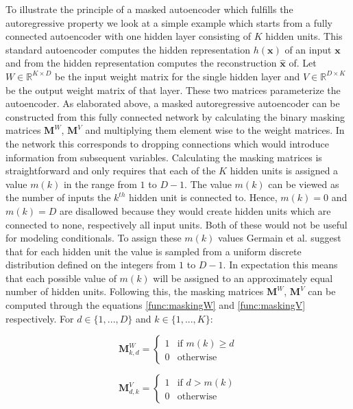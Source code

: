 \documentclass[11pt,titlepage,oneside,openany]{book}
\begin{document}
To illustrate the principle of a masked autoencoder which fulfills the autoregressive property we look at a simple example which starts from a fully connected autoencoder with one hidden layer consisting of $K$ hidden units. This standard autoencoder computes the hidden representation $h(\pmb{x})$ of an input $\pmb{x}$ and from the hidden representation computes the reconstruction $\hat{\pmb{x}}$ of. Let $W \in \mathbb{R}^{K \times D}$ be the input weight matrix for the single hidden layer and $V \in \mathbb{R}^{D \times K}$ be the output weight matrix of that layer. These two matrices parameterize the autoencoder. As elaborated above, a masked autoregressive autoencoder can be constructed from this fully connected network by calculating the binary masking matrices $\mathbf{M}^W$, $\mathbf{M}^V$ and multiplying them element wise to the weight matrices. In the network this corresponds to dropping connections which would introduce information from subsequent variables. Calculating the masking matrices is straightforward and only requires that each of the $K$ hidden units is assigned a value $m(k)$ in the range from $1$ to $D-1$. The value $m(k)$ can be viewed as the number of inputs the $k^{th}$ hidden unit is connected to. Hence, $m(k)=0$ and $m(k)=D$ are disallowed because they would create hidden units which are connected to none, respectively all input units. Both of these would not be useful for modeling conditionals. To assign these $m(k)$ values Germain et al. \cite{germain_made_nodate} suggest that for each hidden unit the value is sampled from a uniform discrete distribution defined on the integers from $1$ to $D-1$. In expectation this means that each possible value of $m(k)$ will be assigned to an approximately equal number of hidden units. Following this, the masking matrices $\mathbf{M}^W$, $\mathbf{M}^V$ can be computed through the equations \ref{func:maskingW} and \ref{func:maskingV} respectively. For $d \in \{1,...,D\}$ and $k \in \{1,...,K\}$:

\begin{equation}
	\label{func:maskingW}
	\mathbf{M}_{k,d}^W = 
	\begin{cases}
		1 & \text{if $m(k) \geq d$}\\
		0 & \text{otherwise}
	\end{cases}
\end{equation}

\begin{equation}
	\label{func:maskingV}
	\mathbf{M}_{d,k}^V = 
	\begin{cases}
		1 & \text{if $d > m(k)$}\\
		0 & \text{otherwise}
	\end{cases}
\end{equation}
\end{document}
